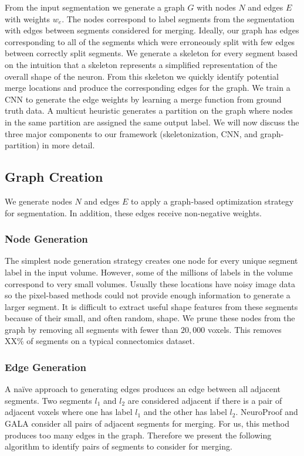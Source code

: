 From the input segmentation we generate a graph $G$ with nodes $N$ and edges $E$ with weights $w_e$. The nodes correspond to label segments from the segmentation with edges between segments considered for merging. Ideally, our graph has edges corresponding to all of the segments which were erroneously split with few edges between correctly split segments. 
We generate a skeleton for every segment based on the intuition that a skeleton represents a simplified representation of the overall shape of the neuron. 
From this skeleton we quickly identify potential merge locations and produce the corresponding edges for the graph. 
We train a CNN to  generate the edge weights by learning a merge function from ground truth data. A multicut heuristic generates a partition on the graph where nodes in the same partition are assigned the same output label. We will now discuss the three major components to our framework (skeletonization, CNN, and graph-partition) in more detail. 

\subsection{Graph Creation}
\label{sec:skeletonization}
We generate nodes $N$ and edges $E$ to apply a graph-based optimization strategy for segmentation.
In addition, these edges receive non-negative weights.

\subsubsection{Node Generation}

The simplest node generation strategy creates one node for every unique segment label in the input volume.
However, some of the millions of labels in the volume correspond to very small volumes.
Usually these locations have noisy image data so the pixel-based methods could not provide enough information to generate a larger segment.
It is difficult to extract useful shape features from these segments because of their small, and often random, shape.
We prune these nodes from the graph by removing all segments with fewer than $20,000$ voxels.
This removes XX\% of segments on a typical connectomics dataset.

\subsubsection{Edge Generation}

A na\"ive approach to generating edges produces an edge between all adjacent segments.
Two segments $l_1$ and $l_2$ are considered adjacent if there is a pair of adjacent voxels where one has label $l_1$ and the other has label $l_2$.
NeuroProof and GALA consider all pairs of adjacent segments for merging.
For us, this method produces too many edges in the graph.
Therefore we present the following algorithm to identify pairs of segments to consider for merging.

